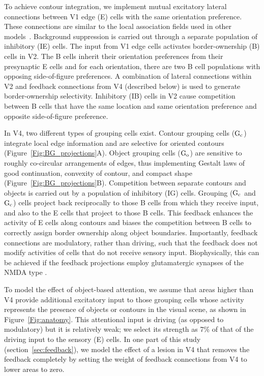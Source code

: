 To achieve contour integration, we implement 
mutual  excitatory lateral connections between V1 edge (E) cells with the same orientation
preference. These connections are similar to the local association
fields used in other models~\citep{Li98,Piech_etal13}. Background
suppression is carried out through a separate population of inhibitory
(IE) cells. The input from V1 edge cells activates border-ownership (B) cells in V2.
The B cells inherit their orientation preferences from their
presynaptic E cells and for each orientation, there are two B cell
populations with opposing side-of-figure preferences.
A combination of lateral connections within V2 and feedback connections from V4 (described
below) is used to generate border-ownership selectivity. Inhibitory
(IB) cells in V2 cause competition between B cells that have 
the same location and same orientation preference and
opposite side-of-figure preference.

In V4, two different types of grouping cells exist. Contour grouping
cells ($\rm G_c$) integrate local edge information and are selective
for oriented contours (Figure~\ref{Fig:BG_projections}A). Object
grouping cells ($\rm G_o$) are sensitive to roughly
co-circular arrangements of edges,
thus implementing Gestalt laws of good continuation, convexity of contour, and compact
shape (Figure~\ref{Fig:BG_projections}B). Competition between separate
contours and objects is carried out by a population of inhibitory (IG)
cells. Grouping ($\rm G_c$ and $\rm G_c$) cells project back 
reciprocally to those B cells from which they receive input, and also to the E
cells that project to those B cells. This feedback enhances the
activity of E cells along contours and biases the competition between
B cells to correctly assign border ownership along object
boundaries. Importantly, feedback connections are modulatory, rather
than driving, such that the feedback does not modify activities of
cells that do not receive sensory input. Biophysically, this can be achieved if the feedback projections employ
glutamatergic synapses of the NMDA type \citep{Wagatsuma_etal16a}.

To model the effect of object-based attention, we assume that areas
higher than V4 provide additional excitatory input to those grouping cells 
whose activity represents the presence of objects or contours in the visual scene, 
as shown in Figure~\ref{Fig:anatomy}. This attentional input is driving
(as opposed to modulatory) but it is relatively weak; we select its strength as 7\% of that of the
driving input to the sensory (E) cells. In one part of this study (section~\ref{sec:feedback}), we 
model the effect of a lesion in V4 that removes the feedback completely by setting the
weight of feedback connections from V4 to lower areas to zero.

